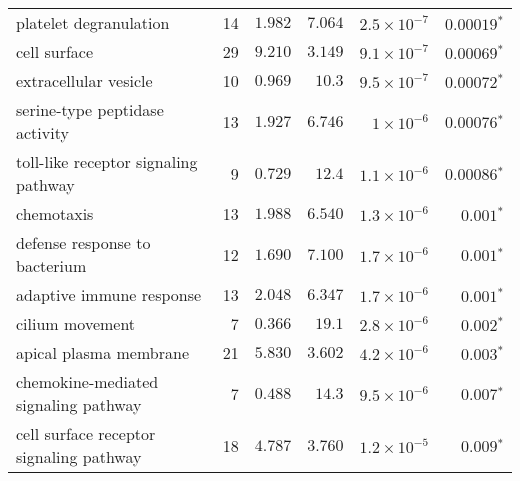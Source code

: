 \begin{longtable}{|l|r|r|r|r|r|}
    platelet degranulation                                & 14                      & $ 1.982$                & $ 7.064$   & $2.5\times 10^{-7}$  & $\bm{0.00019{^*}}$              \\
    cell surface                                          & 29                      & $ 9.210$                & $ 3.149$   & $9.1\times 10^{-7}$  & $\bm{0.00069{^*}}$              \\
    extracellular vesicle                                 & 10                      & $ 0.969$                & $  10.3$     & $9.5\times 10^{-7}$  & $\bm{0.00072{^*}}$              \\
    serine-type peptidase activity                        & 13                      & $ 1.927$                & $ 6.746$   & $ 1\times 10^{-6}$   & $\bm{0.00076{^*}}$              \\
    toll-like receptor signaling pathway                  & 9                       & $ 0.729$                & $  12.4$     & $1.1\times 10^{-6}$  & $\bm{0.00086{^*}}$              \\
    chemotaxis                                            & 13                      & $ 1.988$                & $ 6.540$   & $1.3\times 10^{-6}$  & $\bm{ 0.001{^*}}$               \\
    defense response to bacterium                         & 12                      & $ 1.690$                & $ 7.100$   & $1.7\times 10^{-6}$  & $\bm{ 0.001{^*}}$               \\
    adaptive immune response                              & 13                      & $ 2.048$                & $ 6.347$   & $1.7\times 10^{-6}$  & $\bm{ 0.001{^*}}$               \\
    cilium movement                                       & 7                       & $ 0.366$                & $  19.1$     & $2.8\times 10^{-6}$  & $\bm{ 0.002{^*}}$               \\
    apical plasma membrane                                & 21                      & $ 5.830$                & $ 3.602$   & $4.2\times 10^{-6}$  & $\bm{ 0.003{^*}}$               \\
    chemokine-mediated signaling pathway                  & 7                       & $ 0.488$                & $  14.3$     & $9.5\times 10^{-6}$  & $\bm{ 0.007{^*}}$               \\
    cell surface receptor signaling pathway               & 18                      & $ 4.787$                & $ 3.760$   & $1.2\times 10^{-5}$ & $\bm{ 0.009{^*}}$ \\

\end{longtable}
